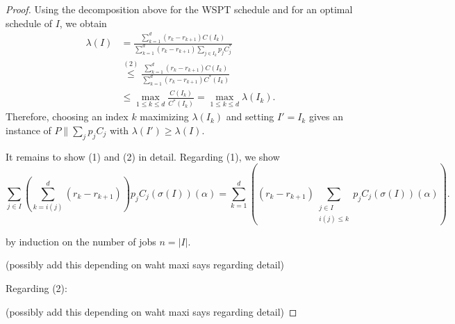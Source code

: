 \documentclass{article}
\begin{document}
\begin{proof}
Using the decomposition above for the WSPT schedule and for an optimal
schedule of $I$, we obtain
\[
\begin{aligned}
        \lambda(I)
        &=
        \frac{
        \sum_{k=1}^d (r_k-r_{k+1}) C(I_k)
        }{
        \sum_{k=1}^d
        (r_k-r_{k+1})
        \sum_{j\in I_k} p_j C_j^*
        }                                                    \\
        &\overset{(2)}{\le}
        \frac{
        \sum_{k=1}^d (r_k-r_{k+1}) C(I_k)
        }{
        \sum_{k=1}^d
        (r_k-r_{k+1}) C^*(I_k)
        }                                                    \\
        &\leq
        \max_{1\leq k\leq d}
        \frac{C(I_k)}{C^*(I_k)}
        =
        \max_{1\leq k\leq d}\lambda(I_k).
\end{aligned}
\]
Therefore, choosing an index $k$ maximizing $\lambda(I_k)$ and setting
$I'=I_k$ gives an instance of $P\|\sum_j p_j C_j$ with
$\lambda(I')\geq \lambda(I)$.

It remains to show (1) and (2) in detail.
Regarding (1), we show
\[
        \sum_{j\in I}
        \left(
            \sum_{k=i(j)}^d (r_k-r_{k+1})
        \right)p_j C_j(\sigma(I))(\alpha)
        =
        \sum_{k=1}^d \left((r_k-r_{k+1})
        \sum_{\substack{j\in I\\ i(j)\leq k}} p_j C_j(\sigma(I))(\alpha) \right).
\]

by induction on the number of jobs $n = |I|$.

(possibly add this depending on waht maxi says regarding detail)

Regarding (2):

(possibly add this depending on waht maxi says regarding detail)

\end{proof}
\end{document}
